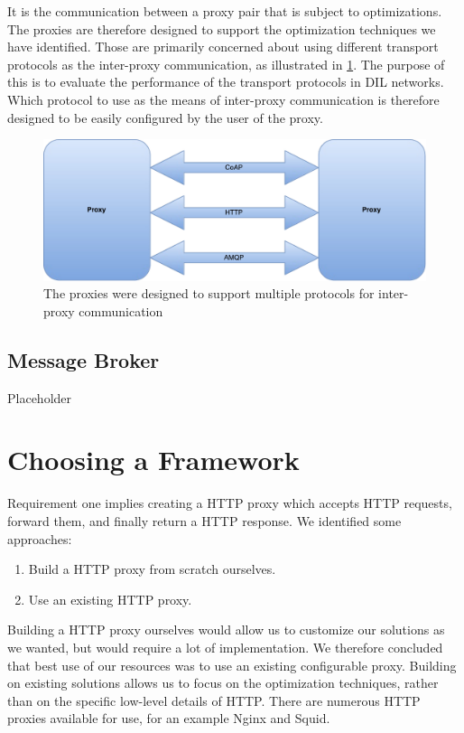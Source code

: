 It is the communication between a proxy pair that is subject to optimizations.
The proxies are therefore designed to support the optimization techniques we
have identified. Those are primarily concerned about using different transport
protocols as the inter-proxy communication, as illustrated in
\cref{figure:proxy-communication}. The purpose of this is to evaluate the
performance of the transport protocols in DIL networks. Which protocol to use as
the means of inter-proxy communication is therefore designed to be easily
configured by the user of the proxy.

\begin{figure}[h]
\includegraphics[scale=0.5]{images/proxy_communcation.pdf}
\caption{The proxies were designed to support multiple protocols for inter-proxy communication}
\label{figure:proxy-communication}
\end{figure}

\subsection{Message Broker}
Placeholder

\section{Choosing a Framework}

Requirement one implies creating a HTTP proxy which accepts HTTP requests,
forward them, and finally return a HTTP response. We identified some approaches:

\begin{enumerate}
    \item Build a HTTP proxy from scratch ourselves.
    \item Use an existing HTTP proxy.
\end{enumerate}

Building a HTTP proxy ourselves would allow us to customize our solutions as we
wanted, but would require a lot of implementation. We therefore concluded that
best use of our resources was to use an existing configurable proxy. 
Building on existing solutions allows us to focus on the optimization techniques, 
rather than on the specific low-level details of HTTP. 
There are numerous HTTP proxies available for use, for an example Nginx and Squid.

